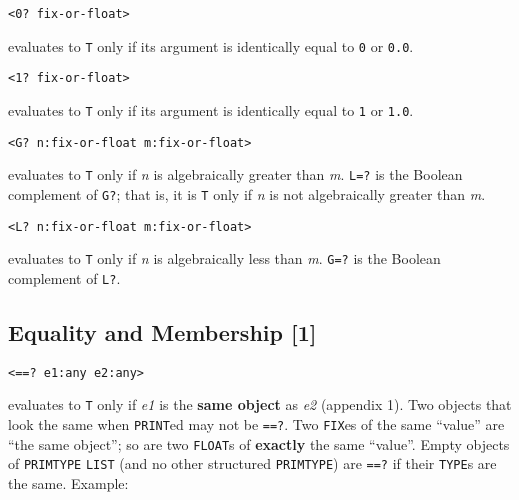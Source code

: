 \documentclass[a4paper]{scrbook}
\begin{document}
\begin{verbatim}
<0? fix-or-float>
\end{verbatim}

 evaluates to \texttt{T} only if its argument is identically equal to \texttt{0} or \texttt{0.0}.

\begin{verbatim}
<1? fix-or-float>
\end{verbatim}

 evaluates to \texttt{T} only if its argument is identically equal to \texttt{1} or \texttt{1.0}.

\begin{verbatim}
<G? n:fix-or-float m:fix-or-float>
\end{verbatim}

 evaluates to \texttt{T} only if \emph{n} is algebraically greater than \emph{m}.
\texttt{L=?} is the Boolean complement of \texttt{G?}; that is, it is \texttt{T} only if
\emph{n} is not algebraically greater than \emph{m}.

\begin{verbatim}
<L? n:fix-or-float m:fix-or-float>
\end{verbatim}

 evaluates to \texttt{T} only if \emph{n} is algebraically less than \emph{m}.
\texttt{G=?} is the Boolean complement of \texttt{L?}.

\subsection{Equality and Membership {[}1{]}}\label{equality-and-membership-1}

\begin{verbatim}
<==? e1:any e2:any>
\end{verbatim}

 evaluates to \texttt{T} only if \emph{e1} is the \textbf{same object} as \emph{e2} (appendix
1). Two objects that look the same when \texttt{PRINT}ed may not be \texttt{==?}. Two \texttt{FIX}es of the same ``value''
are ``the same object''; so are two \texttt{FLOAT}s of \textbf{exactly} the same ``value''. Empty objects of
\texttt{PRIMTYPE} \texttt{LIST} (and no other structured \texttt{PRIMTYPE}) are \texttt{==?} if their
\texttt{TYPE}s are the same. Example:
\end{document}
